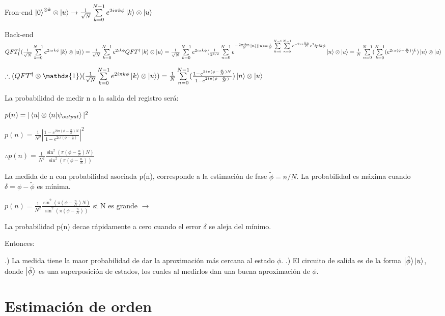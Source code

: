 Fron-end $\ket{0}^{\otimes k} \otimes \ket{u} \rightarrow \frac{1}{\sqrt{N}} \sum\limits_{k=0}^{N-1} e^{2 i \pi k \phi} \ket{k} \otimes \ket{u}$

Back-end $QFT_1^\dagger (\frac{1}{\sqrt{N}} \sum\limits_{k=0}^{N-1} e^{2 i \pi k \phi} \ket{k} \otimes \ket{u}) = \frac{1}{\sqrt{N}} \sum\limits_{k=0}^{N-1} e^{2 i k \phi} QFT^\dagger \ket{k} \otimes \ket{u} = \frac{1}{\sqrt{N}} \sum\limits_{k=0}^{N-1} e^{2 i \pi k \phi} (\frac{1}{2^{k/2}} \sum\limits_{n=0}^{N-1} e^{-\frac{2 \pi i k n}{N} \ket{n}) \ket{u} = \frac{1}{N} \sum\limits_{k=0}^{N-1} \sum\limits_{n=0}^{N-1} e^{- 2 \pi i \frac{k n}{N}} e^2 i pi k \phi} \ket{n} \otimes \ket{u} = \frac{1}{N} \sum\limits_{n=0}^{N-1} (\sum\limits_{k=0}^{N-1} (e^{2 i \pi (\phi - \frac{n}{N})})^k ) \ket{n} \otimes \ket{u}$

$\therefore (QFT^\dagger \otimes \mathds{1}) (\frac{1}{\sqrt{N}} \sum\limits_{k=0}^{N-1} e^{2 i \pi k \phi} \ket{k} \otimes \ket{u}) = \frac{1}{N} \sum\limits_{n=0}^{N-1} (\frac{1 - e^{2 i \pi (\phi - \frac{n}{N})N}}{1 - e^{2 i \pi (\phi - \frac{n}{N})}}) \ket{n} \otimes \ket{u}$

La probabilidad de medir n a la salida del registro será:

$p(n) = |\bra{u} \otimes \bra{n} \ket{\psi_{output}}|^2$

$p(n) = \frac{1}{N^2} |\frac{1 - e^{2 i \pi (\phi - \frac{n}{N})N}}{1 - e^{2 i \pi (\phi - \frac{n}{N})}}|^2$

$\therefore p(n) = \frac{1}{N^2} \frac{\sin^2(\pi (\phi - \frac{n}{N}) N)}{\sin^2(\pi (\phi - \frac{n}{N}))}$

La medida de n con probabilidad asociada p(n), corresponde a la estimación de fase $\tilde{\phi} = n/N$. La probabilidad es máxima cuando $\delta = \phi - \tilde{\phi}$ es mínima.

$p(n) = \frac{1}{N^2} \frac{\sin^2(\pi (\phi - \frac{n}{N}) N)}{\sin^2(\pi (\phi - \frac{n}{N}))}$ si N es grande $\rightarrow$ %

La probabilidad p(n) decae rápidamente a cero cuando el error $\delta$ se aleja del mínimo.

Entonces:

.) La medida tiene la maor probabilidad de dar la aproximación más cercana al estado $\phi$.
.) El circuito de salida es de la forma $\ket{\tilde{\phi}} \ket{u}$, donde $\ket{\tilde{\phi}}$ es una superposición de estados, los cuales al medirlos dan una buena aproximación de $\phi$.

\section{Estimación de orden}


